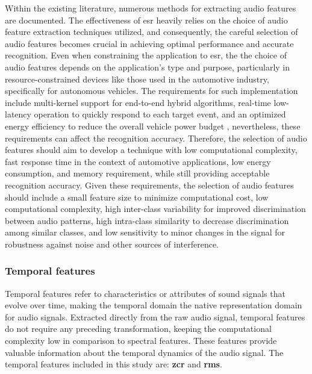Within the existing literature, numerous methods for extracting audio features are documented. The effectiveness of \gls{esr} heavily relies on the choice of audio feature extraction techniques utilized, and consequently, the careful selection of audio features becomes crucial in achieving optimal performance and accurate recognition. Even when constraining the application to \gls{esr}, the the choice of audio features depends on the application’s type and purpose, particularly in resource-constrained devices like those used in the automotive industry, specifically for autonomous vehicles. The requirements for such implementation include multi-kernel support for end-to-end hybrid algorithms, real-time low-latency operation to quickly respond to each target event, and an optimized energy efficiency to reduce the overall vehicle power budget \cite{Yin2023}, nevertheless, these requirements can affect the recognition accuracy. Therefore, the selection of audio features should aim to develop a technique with low computational complexity, fast response time in the context of automotive applications, low energy consumption, and memory requirement, while still providing acceptable recognition accuracy. Given these requirements, the selection of audio features should include a small feature size to minimize computational cost, low computational complexity, high inter-class variability for improved discrimination between audio patterns, high intra-class similarity to decrease discrimination among similar classes, and low sensitivity to minor changes in the signal for robustness against noise and other sources of interference.


\subsubsection{Temporal features}
\label{subsubsec:audio_features_temporal}

Temporal features refer to characteristics or attributes of sound signals that evolve over time, making the temporal domain the native representation domain for audio signals. Extracted directly from the raw audio signal, temporal features do not require any preceding transformation, keeping the computational complexity low in comparison to spectral features. These features provide valuable information about the temporal dynamics of the audio signal. The temporal features included in this study are: \textbf{\gls{zcr}} and \textbf{\gls{rms}}.

